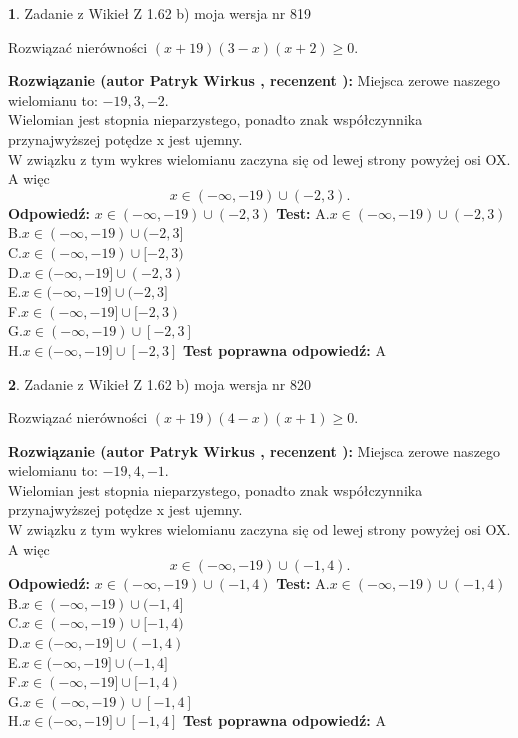 \documentclass[12pt, a4paper]{article}
\theoremstyle{definition} %
\newtheorem{zad}{}
\newcommand{\zadStart}[1]{\begin{zad}#1\newline}
\newcommand{\zadStop}{\end{zad}}
\newcommand{\rozwStart}[2]{\noindent \textbf{Rozwiązanie (autor #1 , recenzent #2): }\newline}
\newcommand{\rozwStop}{\newline}
\newcommand{\odpStart}{\noindent \textbf{Odpowiedź:}\newline}
\newcommand{\odpStop}{\newline}
\newcommand{\testStart}{\noindent \textbf{Test:}\newline}
\newcommand{\testStop}{\newline}
\newcommand{\kluczStart}{\noindent \textbf{Test poprawna odpowiedź:}\newline}
\newcommand{\kluczStop}{\newline}
\begin{document}
\zadStart{Zadanie z Wikieł Z 1.62 b) moja wersja nr 819}

Rozwiązać nierówności $(x+19)(3-x)(x+2)\ge0$.
\zadStop
\rozwStart{Patryk Wirkus}{}
Miejsca zerowe naszego wielomianu to: $-19, 3, -2$.\\
Wielomian jest stopnia nieparzystego, ponadto znak współczynnika przy\linebreak najwyższej potędze x jest ujemny.\\ W związku z tym wykres wielomianu zaczyna się od lewej strony powyżej osi OX. A więc $$x \in (-\infty,-19) \cup (-2,3).$$
\rozwStop
\odpStart
$x \in (-\infty,-19) \cup (-2,3)$
\odpStop
\testStart
A.$x \in (-\infty,-19) \cup (-2,3)$\\
B.$x \in (-\infty,-19) \cup (-2,3]$\\
C.$x \in (-\infty,-19) \cup [-2,3)$\\
D.$x \in (-\infty,-19] \cup (-2,3)$\\
E.$x \in (-\infty,-19] \cup (-2,3]$\\
F.$x \in (-\infty,-19] \cup [-2,3)$\\
G.$x \in (-\infty,-19) \cup [-2,3]$\\
H.$x \in (-\infty,-19] \cup [-2,3]$
\testStop
\kluczStart
A
\kluczStop



\zadStart{Zadanie z Wikieł Z 1.62 b) moja wersja nr 820}

Rozwiązać nierówności $(x+19)(4-x)(x+1)\ge0$.
\zadStop
\rozwStart{Patryk Wirkus}{}
Miejsca zerowe naszego wielomianu to: $-19, 4, -1$.\\
Wielomian jest stopnia nieparzystego, ponadto znak współczynnika przy\linebreak najwyższej potędze x jest ujemny.\\ W związku z tym wykres wielomianu zaczyna się od lewej strony powyżej osi OX. A więc $$x \in (-\infty,-19) \cup (-1,4).$$
\rozwStop
\odpStart
$x \in (-\infty,-19) \cup (-1,4)$
\odpStop
\testStart
A.$x \in (-\infty,-19) \cup (-1,4)$\\
B.$x \in (-\infty,-19) \cup (-1,4]$\\
C.$x \in (-\infty,-19) \cup [-1,4)$\\
D.$x \in (-\infty,-19] \cup (-1,4)$\\
E.$x \in (-\infty,-19] \cup (-1,4]$\\
F.$x \in (-\infty,-19] \cup [-1,4)$\\
G.$x \in (-\infty,-19) \cup [-1,4]$\\
H.$x \in (-\infty,-19] \cup [-1,4]$
\testStop
\kluczStart
A
\kluczStop
\end{document}
